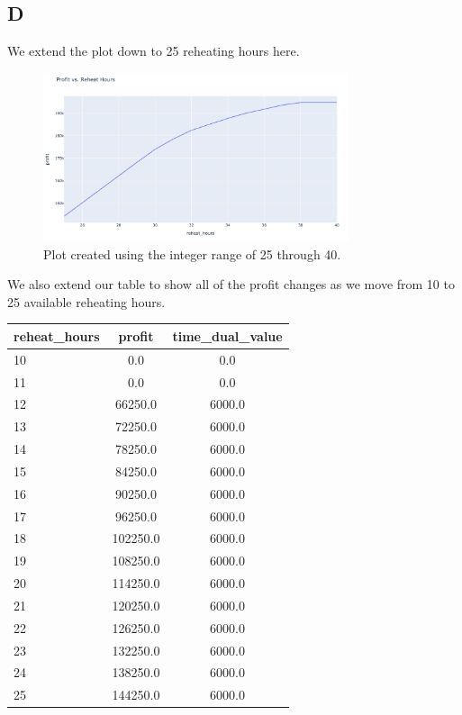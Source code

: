 \pagebreak

\subsection*{D}

We extend the plot down to 25 reheating hours here.

\begin{figure}[htbp]
    \centering
    \includegraphics[width=0.8\textwidth]{../images/profit-vs-reheat-2.png}
    \caption{Plot created using the integer range of 25 through 40.}
\end{figure}

We also extend our table to show all of the profit changes as we move from 10 to 25 available reheating hours.

\begin{table}[!ht]
    \centering
    \begin{tabular}{lcc}
    \hline
        reheat\_hours & profit & time\_dual\_value \\ \hline
        10 & 0.0 & 0.0 \\
        11 & 0.0 & 0.0 \\
        12 & 66250.0 & 6000.0 \\
        13 & 72250.0 & 6000.0 \\
        14 & 78250.0 & 6000.0 \\
        15 & 84250.0 & 6000.0 \\
        16 & 90250.0 & 6000.0 \\
        17 & 96250.0 & 6000.0 \\
        18 & 102250.0 & 6000.0 \\
        19 & 108250.0 & 6000.0 \\
        20 & 114250.0 & 6000.0 \\
        21 & 120250.0 & 6000.0 \\
        22 & 126250.0 & 6000.0 \\
        23 & 132250.0 & 6000.0 \\
        24 & 138250.0 & 6000.0 \\
        25 & 144250.0 & 6000.0 \\
    \hline
    \end{tabular}
\end{table}


